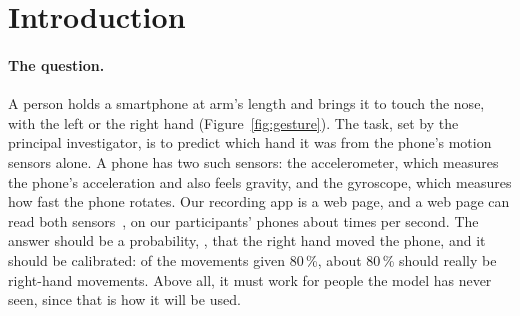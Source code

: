 \section{Introduction}\label{sec:intro}

\paragraph{The question.} A person holds a smartphone at arm's length and brings it to touch the nose, with the
left or the right hand (Figure~\ref{fig:gesture}). The task, set by the principal investigator, is to predict
which hand it was from the phone's motion sensors alone. A phone has two such sensors: the accelerometer, which measures
the phone's acceleration and also feels gravity, and the gyroscope, which measures how fast the phone rotates. Our
recording app is a web page, and a web page can read both sensors~\cite{w3c2025deviceorientation}, on our
participants' phones about  times per second. The answer should be a probability,
\pright{}, that the right hand moved the phone, and it should be calibrated: of the movements given 80\,\%, about
80\,\% should really be right-hand movements. Above all, it must work for people the model has never seen, since
that is how it will be used.

